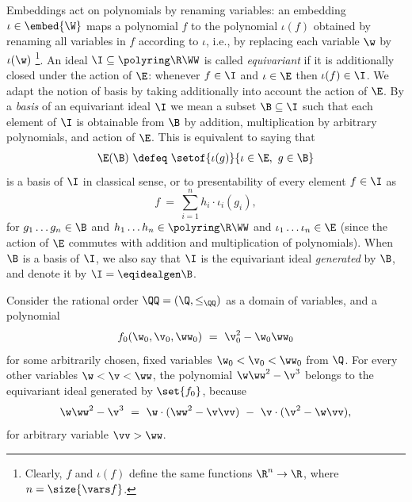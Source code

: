 
Embeddings act on polynomials by renaming variables: 
an embedding $\iota \in \embed {\W}$ maps a polynomial $f$ to the polynomial $\iota(f)$ 
obtained by renaming all
variables in $f$ according to $\iota$, i.e., by replacing each variable $\w$ by $\iota(\w)$%
\footnote{
Clearly, $f$ and $\iota(f)$ define the same functions $\R^n\to\R$, where $n=\size{\vars f}$.
}.
%
An ideal $\I\subseteq \polyring \R \WW$ is called \emph{equivariant} if it is additionally closed under
the action of $\E$:
whenever $f\in \I$ and $\iota \in \E$ then  $\iota(f) \in \I$.
We adapt the notion of basis by taking additionally into account the action of $\E$.
By a \emph{basis} of an equivariant ideal $\I$ we mean a subset 
$\B\subseteq \I$ such that each element of $\I$ is obtainable from $\B$ by addition, multiplication 
by arbitrary polynomials, and action of $\E$.
This is equivalent to saying that
%
\begin{align} \label{eq:basis}
\E(\B) \ \defeq \ \setof{\iota(g)}{\iota \in \E, \ g\in\B}
\end{align}
%
is a basis of $\I$ in classical sense, or to presentability of 
every element $f\in\I$ as
\[
f \ = \ \sum_{i=1}^{n} h_i \cdot \iota_i(g_i),
\]
for $g_1 \ldots g_n \in \B$ and $h_1 \ldots h_n \in \polyring \R \WW$ and $\iota_1 \ldots \iota_n \in \E$
(since the action of $\E$ commutes with addition and multiplication of polynomials).
%
When $\B$ is a basis of $\I$, 
we also say that $\I$ is the equivariant ideal \emph{generated} by $\B$, and denote it by
$\I = \eqidealgen \B$.

\begin{slexample} \label{ex:Q}
Consider the rational order $\QQ = (\Q, \leq_\QQ)$ as a domain of variables, 
and a polynomial
\[
f_0(\w_0, \v_0, \ww_0) \ = \  \v_0^2 - \w_0 \ww_0
\]
for some arbitrarily chosen, fixed variables $\w_0 < \v_0 < \ww_0$ from $\Q$.
For every other variables $\w < \v < \ww$, the polynomial
$
\w \ww^2 - \v^3
$
belongs to the equivariant ideal generated by $\set{f_0}$, because
\[
\w \ww^2 - \v^3
\ = \ 
\w \cdot (\ww^2 - \v\vv) \ - \ 
\v \cdot  (\v^2 - \w \vv),
\]
for arbitrary variable $\vv > \ww$.
\end{slexample}

